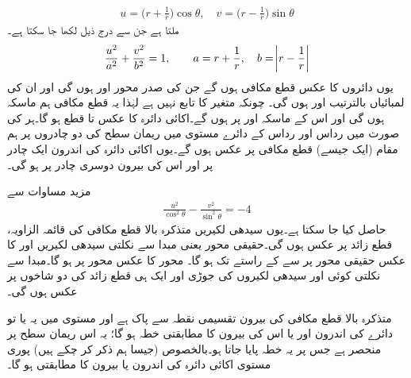 \begin{align}\label{مساوات_نقش_ہوائی_حرکیات_ب}
u=\big(r+\frac{1}{r}\big)\cos \theta,\quad v=\big(r-\frac{1}{r}\big)\sin\theta
\end{align}
ملتا ہے جن سے درج ذیل لکھا جا سکتا ہے۔
\begin{align*}
\frac{u^2}{a^2}+\frac{v^2}{b^2}=1,\quad \quad a=r+\frac{1}{r},\quad b=\abs{r-\frac{1}{r}}
\end{align*}
یوں  دائروں کا عکس قطع مکافی ہوں گے جن کی صدر محور  اور  ہوں گی اور ان کی لمبائیاں بالترتیب  اور  ہوں گی۔ چونکہ  متغیر  کا تابع نہیں ہے لہٰذا یہ قطع مکافی ہم ماسکہ ہوں گی اور اس کے ماسکہ  اور  پر ہوں  گے۔اکائی دائرہ  کا عکس  تا  قطع ہو گا۔ہر  کی صورت میں رداس  اور رداس  کے دائرے   مستوی میں ریمان سطح کی دو چادروں پر ہم مقام (ایک جیسے)  قطع مکافی پر عکس ہوں گے۔یوں اکائی دائرہ  کی اندرون ایک چادر پر اور اس کی بیرون دوسری چادر پر ہو گی۔

مزید مساوات  سے
\begin{align}
\frac{u^2}{\cos^2\theta}-\frac{v^2}{\sin^2\theta}=-4
\end{align}
حاصل کیا جا سکتا ہے۔یوں سیدھی لکیریں  متذکرہ بالا قطع مکافی کی قائمہ الزاویہ، قطع زائد پر عکس ہوں گی۔حقیقی محور یعنی مبدا سے نکلتی سیدھی لکیریں  اور  کا عکس حقیقی محور پر  سے  کے راستے  تک  ہو گا۔  محور کا عکس   محور پر ہو گا۔مبدا سے نکلتی کوئی اور سیدھی لکیروں کی جوڑی   اور  ایک ہی قطع زائد کی دو شاخوں پر عکس ہوں گی۔

متذکرہ بالا قطع مکافی کی بیرون تقسیمی نقطہ سے پاک ہے اور  مستوی میں یہ یا تو دائرے کی اندرون اور یا اس کی بیرون کا مطابقتی خطہ ہو گا؛ یہ اس ریمان سطح پر منحصر ہے جس پر یہ خطہ پایا جاتا ہو۔بالخصوص (جیسا ہم ذکر کر چکے ہیں) پوری  مستوی اکائی دائرہ  کی اندرون یا بیرون کا مطابقتی ہو گا۔

